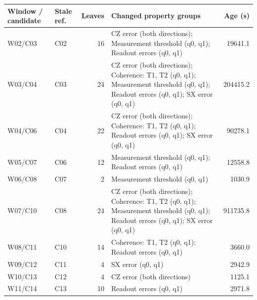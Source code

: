 \begin{tabularx}{\linewidth}{@{}llrYr@{}}\toprule
Window / candidate & Stale ref. & Leaves & Changed property groups & Age (s)\\\midrule
W02/C03 & C02 & 16 & CZ error (both directions); Measurement threshold (q0, q1); Readout errors (q0, q1) & 19641.1\\
W03/C04 & C03 & 24 & CZ error (both directions); Coherence: T1, T2 (q0, q1); Measurement threshold (q0, q1); Readout errors (q0, q1); SX error (q0, q1) & 204415.2\\
W04/C06 & C04 & 22 & CZ error (both directions); Coherence: T1, T2 (q0, q1); Readout errors (q0, q1); SX error (q0, q1) & 90278.1\\
W05/C07 & C06 & 12 & Measurement threshold (q0, q1); Readout errors (q0, q1) & 12558.8\\
W06/C08 & C07 & 2 & Measurement threshold (q0, q1) & 1030.9\\
W07/C10 & C08 & 24 & CZ error (both directions); Coherence: T1, T2 (q0, q1); Measurement threshold (q0, q1); Readout errors (q0, q1); SX error (q0, q1) & 911735.8\\
W08/C11 & C10 & 14 & Coherence: T1, T2 (q0, q1); Readout errors (q0, q1) & 3660.0\\
W09/C12 & C11 & 4 & SX error (q0, q1) & 2942.9\\
W10/C13 & C12 & 4 & CZ error (both directions) & 1125.1\\
W11/C14 & C13 & 10 & Readout errors (q0, q1) & 2971.8\\
\bottomrule
\end{tabularx}
